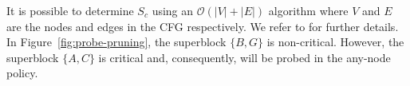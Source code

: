 It is possible to determine $S_c$ using an $\mathcal{O}(|V|+|E|)$ algorithm where $V$ and $E$ are the nodes and edges in the CFG 
respectively.
We refer to \cite{Agrawal1994} for further details.
In Figure~\ref{fig:probe-pruning}, the superblock $\{B,G\}$ is non-critical. However, the superblock $\{A,C\}$ is critical and, consequently, will be probed in the any-node policy.

